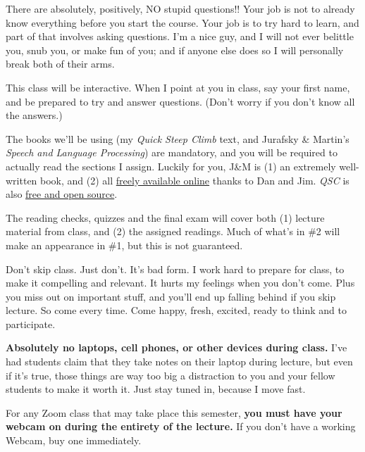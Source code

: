 \documentclass[12pt]{article}
\begin{document}
\begin{compactenum}

\item There are absolutely, positively, NO stupid questions!! Your job is
not to already know everything before you start the course. Your job is to
try hard to learn, and part of that involves asking questions. I'm a nice
guy, and I will not ever belittle you, snub you, or make fun of you; and if
anyone else does so I will personally break both of their arms.

\item This class will be interactive. When I point at you in class, say
your first name, and be prepared to try and answer questions. (Don't worry
if you don't know all the answers.) 

\item The books we'll be using (my \textit{Quick Steep Climb} text, and
Jurafsky \& Martin's \textit{Speech and Language Processing}) are mandatory,
and you will be required to actually read the sections I assign. Luckily for
you, J\&M is (1) an extremely well-written book, and (2) all
\href{https://web.stanford.edu/~jurafsky/slp3/}{freely available online} thanks
to Dan and Jim. \textit{QSC} is also
\href{http://stephendavies.org/quick.pdf}{free and open source}.

\item The reading checks, quizzes and the final exam will cover both (1)
lecture material from class, and (2) the assigned readings. Much of what's in
\#2 will make an appearance in \#1, but this is not guaranteed.

\item Don't skip class. Just don't. It's bad form. I work hard to prepare for
class, to make it compelling and relevant. It hurts my feelings when you don't
come. Plus you miss out on important stuff, and you'll end up falling behind
if you skip lecture.  So come every time. Come happy, fresh, excited, ready to
think and to participate. 

\item \textbf{Absolutely no laptops, cell phones, or other devices during
class.} I've had students claim that they take notes on their laptop during
lecture, but even if it's true, those things are way too big a distraction to
you and your fellow students to make it worth it. Just stay tuned in, because I
move fast.

\item For any Zoom class that may take place this semester, \textbf{you must
have your webcam on during the entirety of the lecture.} If you don't have a
working Webcam, buy one immediately.

\end{compactenum}
\end{document}

